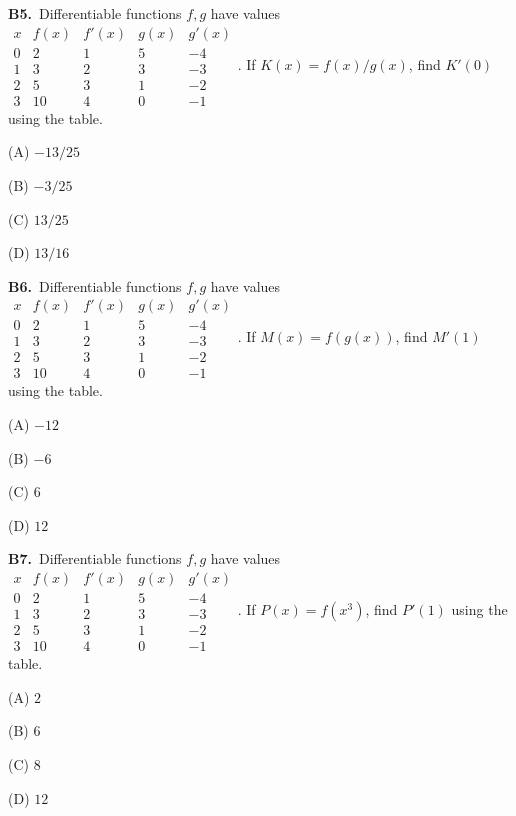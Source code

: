 \documentclass[11pt]{article}
\begin{document}
\bigskip\noindent\textbf{B5.}\ Differentiable functions $f,g$ have values $\begin{array}{c|rrrr}x&f(x)&f\prime(x)&g(x)&g\prime(x)\\0&2&1&5&-4\\1&3&2&3&-3\\2&5&3&1&-2\\3&10&4&0&-1\end{array}$. If $K(x)=f(x)/g(x)$, find $K'(0)$ using the table.
\begin{list}{}{\setlength{\leftmargin}{3em}\setlength{\labelwidth}{2.5em}\setlength{\itemsep}{0pt}\setlength{\topsep}{2pt}}
\item[(A)] $-13/25$
\item[(B)] $-3/25$
\item[(C)] $13/25$
\item[(D)] $13/16$
\end{list}

\bigskip\noindent\textbf{B6.}\ Differentiable functions $f,g$ have values $\begin{array}{c|rrrr}x&f(x)&f\prime(x)&g(x)&g\prime(x)\\0&2&1&5&-4\\1&3&2&3&-3\\2&5&3&1&-2\\3&10&4&0&-1\end{array}$. If $M(x)=f(g(x))$, find $M'(1)$ using the table.
\begin{list}{}{\setlength{\leftmargin}{3em}\setlength{\labelwidth}{2.5em}\setlength{\itemsep}{0pt}\setlength{\topsep}{2pt}}
\item[(A)] $-12$
\item[(B)] $-6$
\item[(C)] $6$
\item[(D)] $12$
\end{list}

\bigskip\noindent\textbf{B7.}\ Differentiable functions $f,g$ have values $\begin{array}{c|rrrr}x&f(x)&f\prime(x)&g(x)&g\prime(x)\\0&2&1&5&-4\\1&3&2&3&-3\\2&5&3&1&-2\\3&10&4&0&-1\end{array}$. If $P(x)=f(x^3)$, find $P'(1)$ using the table.
\begin{list}{}{\setlength{\leftmargin}{3em}\setlength{\labelwidth}{2.5em}\setlength{\itemsep}{0pt}\setlength{\topsep}{2pt}}
\item[(A)] $2$
\item[(B)] $6$
\item[(C)] $8$
\item[(D)] $12$
\end{list}
\end{document}
